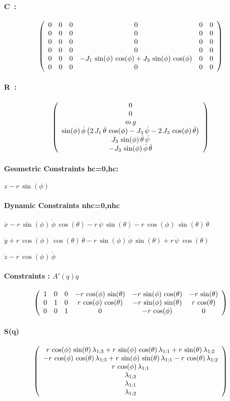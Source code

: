 \paragraph{C~:} 
$$ \left(\begin{array}{cccccc} 0 & 0 & 0 & 0 & 0 & 0 \cr 0 & 0 & 0 & 0
 & 0 & 0 \cr 0 & 0 & 0 & 0 & 0 & 0 \cr 0 & 0 & 0 & 0 & 0 & 0 \cr 0 & 0
 & 0 & -J_1\,\sin(\phi)\,\cos(\phi)+J_3\,\sin(\phi)\,\cos(\phi) & 0 & 
0 \cr 0 & 0 & 0 & 0 & 0 & 0 \end{array} \right) $$
\paragraph{R~:} 
$$ \left(\begin{array}{c} 0 \cr 0 \cr m\,g \cr \sin(\phi)\,\dot{\phi}
\left(2\,J_1\,\dot{\theta}\,\cos(\phi)-J_3\,\dot{\psi}-2\,J_3\,\cos(
\phi)\,\dot{\theta}\right) \cr J_3\,\sin(\phi)\,\dot{\theta}\,
\dot{\psi} \cr -J_3\,\sin(\phi)\,\dot{\phi}\,\dot{\theta}
 \end{array} \right) $$
\paragraph{Geometric Constraints hc=0,hc:} 


$ z-r\,\sin(\phi) $
\paragraph{Dynamic Constraints nhc=0,nhc} 


$ \dot{x}-r\,\sin(\phi)\,\dot{\phi}\,\cos(\theta)-r\,\dot{\psi}\,\sin(
\theta)-r\,\cos(\phi)\,\sin(\theta)\,\dot{\theta} $

$ \dot{y}+r\,\cos(\phi)\,\cos(\theta)\,\dot{\theta}-r\,\sin(\phi)\,
\dot{\phi}\,\sin(\theta)+r\,\dot{\psi}\,\cos(\theta) $

$ \dot{z}-r\,\cos(\phi)\,\dot{\phi} $
\paragraph{Constraints : $A'(q)\dot{q}$} 
$$ \left(\begin{array}{cccccc} 1 & 0 & 0 & -r\,\cos(\phi)\,\sin(\theta
) & -r\,\sin(\phi)\,\cos(\theta) & -r\,\sin(\theta) \cr 0 & 1 & 0 & r
\,\cos(\phi)\,\cos(\theta) & -r\,\sin(\phi)\,\sin(\theta) & r\,\cos(
\theta) \cr 0 & 0 & 1 & 0 & -r\,\cos(\phi) & 0 \end{array} \right) $$
\paragraph{ S(q)} 
$$ \left(\begin{array}{c} r\,\cos(\phi)\,\sin(\theta)\,{\lambda_{1;3}}
+r\,\sin(\phi)\,\cos(\theta)\,{\lambda_{1;1}}+r\,\sin(\theta)\,{
\lambda_{1;2}} \cr -r\,\cos(\phi)\,\cos(\theta)\,{\lambda_{1;3}}+r\,
\sin(\phi)\,\sin(\theta)\,{\lambda_{1;1}}-r\,\cos(\theta)\,{\lambda_{1
;2}} \cr r\,\cos(\phi)\,{\lambda_{1;1}} \cr {\lambda_{1;3}} \cr {
\lambda_{1;1}} \cr {\lambda_{1;2}} \end{array} \right) $$
